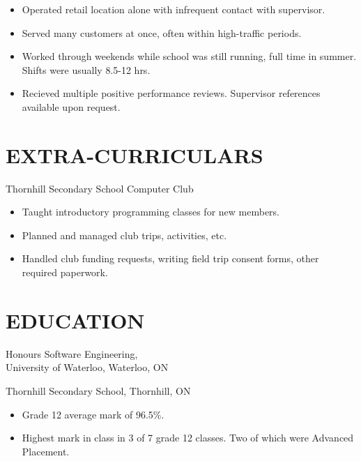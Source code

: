 \documentclass[11pt, margin]{res}
\begin{document}
\begin{resume}
                \begin{itemize}[itemsep=-2pt]
                    \item Operated retail location alone with infrequent contact with supervisor.
                    \item Served many customers at once, often within high-traffic periods.
                    \item Worked through weekends while school was still running, full time in summer. Shifts were usually 8.5-12 hrs.
                    \item Recieved multiple positive performance reviews. Supervisor references available upon request.
                \end{itemize}
 
\section{EXTRA-CURRICULARS}             
            Thornhill Secondary School Computer Club
            \begin{itemize}[itemsep=-2pt]
                \item Taught introductory programming classes for new members.
                \item Planned and managed club trips, activities, etc.
                \item Handled club funding requests, writing field trip consent forms, other required paperwork.
            \end{itemize}



\section{EDUCATION} 
                    Honours Software Engineering, \\
                    University of Waterloo, Waterloo, ON

                    Thornhill Secondary School, Thornhill, ON
                    \begin{itemize}[itemsep=-2pt]
                        \item Grade 12 average mark of 96.5\%.
                        \item Highest mark in class in 3 of 7 grade 12 classes. Two of which were Advanced Placement.
                    \end{itemize}




\end{resume}
\end{document}
